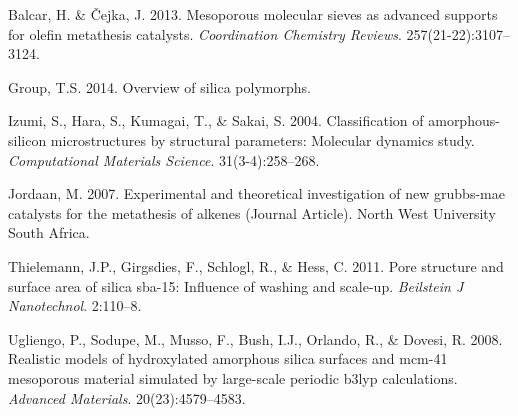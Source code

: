 \documentclass[]{article}
\begin{document}
\hypertarget{refs}{}
\leavevmode\hypertarget{ref-RN44}{}%
Balcar, H. \& Čejka, J. 2013. Mesoporous molecular sieves as advanced
supports for olefin metathesis catalysts. \emph{Coordination Chemistry
Reviews}. 257(21-22):3107--3124.

\leavevmode\hypertarget{ref-Rep1}{}%
Group, T.S. 2014. Overview of silica polymorphs.

\leavevmode\hypertarget{ref-RN96}{}%
Izumi, S., Hara, S., Kumagai, T., \& Sakai, S. 2004. Classification of
amorphous-silicon microstructures by structural parameters: Molecular
dynamics study. \emph{Computational Materials Science}.
31(3-4):258--268.

\leavevmode\hypertarget{ref-RN88}{}%
Jordaan, M. 2007. Experimental and theoretical investigation of new
grubbs-mae catalysts for the metathesis of alkenes (Journal Article).
North West University South Africa.

\leavevmode\hypertarget{ref-RN92}{}%
Thielemann, J.P., Girgsdies, F., Schlogl, R., \& Hess, C. 2011. Pore
structure and surface area of silica sba-15: Influence of washing and
scale-up. \emph{Beilstein J Nanotechnol}. 2:110--8.

\leavevmode\hypertarget{ref-RN13}{}%
Ugliengo, P., Sodupe, M., Musso, F., Bush, I.J., Orlando, R., \& Dovesi,
R. 2008. Realistic models of hydroxylated amorphous silica surfaces and
mcm-41 mesoporous material simulated by large-scale periodic b3lyp
calculations. \emph{Advanced Materials}. 20(23):4579--4583.
\end{document}

